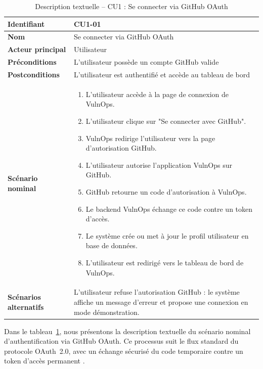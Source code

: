 \documentclass[12pt, a4paper, oneside]{report}
\begin{document}
\begin{table}[H]
    \centering
    \caption{Description textuelle -- CU1 : Se connecter via GitHub OAuth}
    \label{tab:desc_uc1}
    \begin{tabularx}{\textwidth}{|l|X|}
        \hline
        \textbf{Identifiant} & CU1-01 \\
        \hline
        \textbf{Nom} & Se connecter via GitHub OAuth \\
        \hline
        \textbf{Acteur principal} & Utilisateur \\
        \hline
        \textbf{Préconditions} & L'utilisateur possède un compte GitHub valide \\
        \hline
        \textbf{Postconditions} & L'utilisateur est authentifié et accède au tableau de bord \\
        \hline
        \textbf{Scénario nominal} & 
        \begin{enumerate}[leftmargin=1.2em]
            \item L'utilisateur accède à la page de connexion de VulnOps.
            \item L'utilisateur clique sur "Se connecter avec GitHub".
            \item VulnOps redirige l'utilisateur vers la page d'autorisation GitHub.
            \item L'utilisateur autorise l'application VulnOps sur GitHub.
            \item GitHub retourne un code d'autorisation à VulnOps.
            \item Le backend VulnOps échange ce code contre un token d'accès.
            \item Le système crée ou met à jour le profil utilisateur en base de données.
            \item L'utilisateur est redirigé vers le tableau de bord de VulnOps.
        \end{enumerate} \\
        \hline
        \textbf{Scénarios alternatifs} & 
        L'utilisateur refuse l'autorisation GitHub : le système affiche un message d'erreur et propose une connexion en mode démonstration. \\
        \hline
    \end{tabularx}
\end{table}

Dans le tableau~\ref{tab:desc_uc1}, nous présentons la description textuelle
du scénario nominal d'authentification via GitHub OAuth. Ce processus suit le
flux standard du protocole OAuth~2.0, avec un échange sécurisé du code temporaire
contre un token d'accès permanent \cite{oauth2rfc}.
\end{document}
